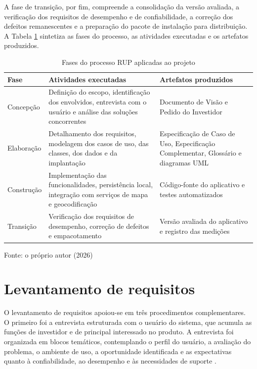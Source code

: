 A fase de transição, por fim, compreende a consolidação da versão avaliada, a verificação dos requisitos de desempenho e de confiabilidade, a correção dos defeitos remanescentes e a preparação do pacote de instalação para distribuição. A Tabela \ref{tab:fases-rup} sintetiza as fases do processo, as atividades executadas e os artefatos produzidos.

\begin{table}[!ht]
    \centering
    \caption{Fases do processo RUP aplicadas ao projeto}
    \label{tab:fases-rup}
    \begin{tabular}{p{3cm} p{6cm} p{6cm}}
        \hline
        \textbf{Fase} & \textbf{Atividades executadas} & \textbf{Artefatos produzidos} \\
        \hline
        Concepção & Definição do escopo, identificação dos envolvidos, entrevista com o usuário e análise das soluções concorrentes & Documento de Visão e Pedido do Investidor \\
        \hline
        Elaboração & Detalhamento dos requisitos, modelagem dos casos de uso, das classes, dos dados e da implantação & Especificação de Caso de Uso, Especificação Complementar, Glossário e diagramas UML \\
        \hline
        Construção & Implementação das funcionalidades, persistência local, integração com serviços de mapa e geocodificação & Código-fonte do aplicativo e testes automatizados \\
        \hline
        Transição & Verificação dos requisitos de desempenho, correção de defeitos e empacotamento & Versão avaliada do aplicativo e registro das medições \\
        \hline
    \end{tabular}
    \vspace{2pt}
    \footnotesize Fonte: o próprio autor (2026)
\end{table}

\section{Levantamento de requisitos}

O levantamento de requisitos apoiou-se em três procedimentos complementares. O primeiro foi a entrevista estruturada com o usuário do sistema, que acumula as funções de investidor e de principal interessado no produto. A entrevista foi organizada em blocos temáticos, contemplando o perfil do usuário, a avaliação do problema, o ambiente de uso, a oportunidade identificada e as expectativas quanto à confiabilidade, ao desempenho e às necessidades de suporte \cite{sriPedido2025}.

